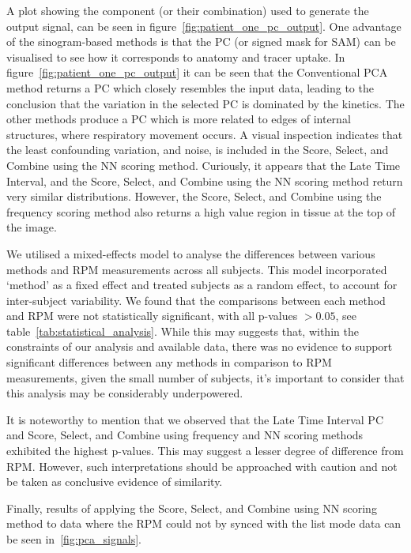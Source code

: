     A plot showing the component (or their combination) used to generate the output signal, can be seen in figure~\ref{fig:patient_one_pc_output}. One advantage of the sinogram-based methods is that the \gls{PC} (or signed mask for \gls{SAM}) can be visualised to see how it corresponds to anatomy and tracer uptake. In figure~\ref{fig:patient_one_pc_output} it can be seen that the Conventional \gls{PCA} method returns a \gls{PC} which closely resembles the input data, leading to the conclusion that the variation in the selected \gls{PC} is dominated by the kinetics. The other methods produce a \gls{PC} which is more related to edges of internal structures, where respiratory movement occurs. A visual inspection indicates that the least confounding variation, and noise, is included in the Score, Select, and Combine using the \gls{NN} scoring method. Curiously, it appears that the Late Time Interval, and the Score, Select, and Combine using the \gls{NN} scoring method return very similar distributions. However, the Score, Select, and Combine using the frequency scoring method also returns a high value region in tissue at the top of the image.

    We utilised a mixed-effects model to analyse the differences between various methods and \gls{RPM} measurements across all subjects. This model incorporated `method' as a fixed effect and treated subjects as a random effect, to account for inter-subject variability. We found that the comparisons between each method and \gls{RPM} were not statistically significant, with all p-values $> 0.05$, see table~\ref{tab:statistical_analysis}. While this may suggests that, within the constraints of our analysis and available data, there was no evidence to support significant differences between any methods in comparison to \gls{RPM} measurements, given the small number of subjects, it's important to consider that this analysis may be considerably underpowered. 

    It is noteworthy to mention that we observed that the Late Time Interval \gls{PC} and Score, Select, and Combine using frequency and \gls{NN} scoring methods exhibited the highest p-values. This may suggest a lesser degree of difference from \gls{RPM}. However, such interpretations should be approached with caution and not be taken as conclusive evidence of similarity.

    Finally, results of applying the Score, Select, and Combine using \gls{NN} scoring method to data where the \gls{RPM} could not by synced with the list mode data can be seen in~\ref{fig:pca_signals}.
    
